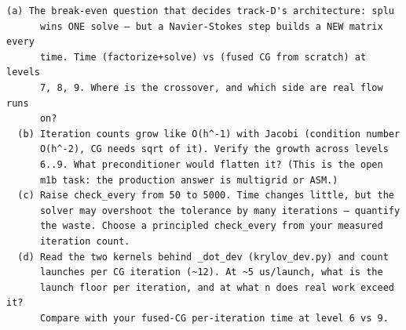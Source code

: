 \begin{explore}
\begin{verbatim}
(a) The break-even question that decides track-D's architecture: splu
      wins ONE solve — but a Navier-Stokes step builds a NEW matrix every
      time. Time (factorize+solve) vs (fused CG from scratch) at levels
      7, 8, 9. Where is the crossover, and which side are real flow runs
      on?
  (b) Iteration counts grow like O(h^-1) with Jacobi (condition number
      O(h^-2), CG needs sqrt of it). Verify the growth across levels
      6..9. What preconditioner would flatten it? (This is the open
      m1b task: the production answer is multigrid or ASM.)
  (c) Raise check_every from 50 to 5000. Time changes little, but the
      solver may overshoot the tolerance by many iterations — quantify
      the waste. Choose a principled check_every from your measured
      iteration count.
  (d) Read the two kernels behind _dot_dev (krylov_dev.py) and count
      launches per CG iteration (~12). At ~5 us/launch, what is the
      launch floor per iteration, and at what n does real work exceed it?
      Compare with your fused-CG per-iteration time at level 6 vs 9.
\end{verbatim}
\end{explore}
